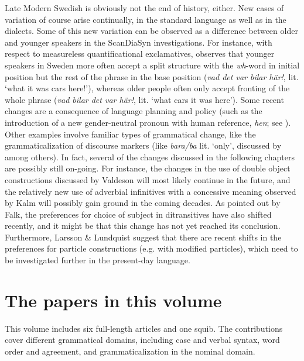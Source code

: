 \documentclass[output=paper]{langscibook}
\begin{document}
Late Modern Swedish is obviously not the end of history, either. New cases of variation of course arise continually, in the standard language as well as in the dialects. Some of this new variation can be observed as a difference between older and younger speakers in the ScanDiaSyn investigations. For instance, with respect to measureless quantificational exclamatives, \citet{Vangsnes2014} observes that younger speakers in Sweden more often accept a split structure with the \textit{wh}{}-word in initial position but the rest of the phrase in the base position (\textit{vad det var bilar här!}, lit. ‘what it was cars here!’), whereas older people often only accept fronting of the whole phrase (\textit{vad bilar det var här!}, lit. ‘what cars it was here’). Some recent changes are a consequence of language planning and policy (such as the introduction of a new gender-neutral pronoun with human reference, \textit{hen}; see \citealt{LedinLyngfelt2013}). Other examples involve familiar types of grammatical change, like the grammaticalization of discourse markers (like \textit{bara/ba} lit. ‘only’, discussed by \citealt{Eriksson1995} among others). In fact, several of the changes discussed in the following chapters are possibly still on-going. For instance, the changes in the use of double object constructions discussed by Valdeson will most likely continue in the future, and the relatively new use of adverbial infinitives with a concessive meaning observed by Kalm will possibly gain ground in the coming decades. As pointed out by Falk, the preferences for choice of subject in ditransitives have also shifted recently, and it might be that this change has not yet reached its conclusion. Furthermore, Larsson \& Lundquist suggest that there are recent shifts in the preferences for particle constructions (e.g. with modified particles), which need to be investigated further in the present-day language.

\section{The papers in this volume}\label{sec:intro:4}


This volume includes six full-length articles and one squib. The contributions cover different grammatical domains, including case and verbal syntax, word order and agreement, and grammaticalization in the nominal domain. 
\end{document}
